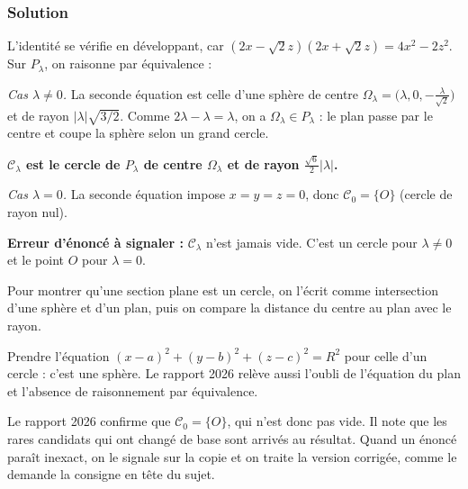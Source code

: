 \documentclass[11pt,a4paper]{article}
\newcommand{\equationajustee}[1]{%
  \sbox{\boiteequation}{$\displaystyle #1$}%
  \ifdim\wd\boiteequation>\linewidth
    \[\resizebox{\linewidth}{!}{\usebox{\boiteequation}}\]%
  \else
    \[#1\]%
  \fi}
\begin{document}
\hypertarget{solution-34}{%
\subsubsection{Solution}\label{solution-34}}

L'identité se vérifie en développant, car \((2x-\sqrt2z)(2x+\sqrt2z)=4x^2-2z^2\). Sur \(P_\lambda\), on raisonne par équivalence :

\equationajustee{M\in{\mathcal{C}}_\lambda\iff\begin{cases}2x+\sqrt2z=\lambda\\ (x-\lambda)^2+y^2+\big(z+\frac\lambda{\sqrt2}\big)^2=\frac32\lambda^2.\end{cases}}

\emph{Cas \(\lambda\neq0\).} La seconde équation est celle d'une sphère de centre \(\Omega_\lambda=\big(\lambda,0,-\frac\lambda{\sqrt2}\big)\) et de rayon \(|\lambda|\sqrt{3/2}\). Comme \(2\lambda-\lambda=\lambda\), on a \(\Omega_\lambda\in P_\lambda\) : le plan passe par le centre et coupe la sphère selon un grand cercle.

\textbf{\({\mathcal{C}}_\lambda\) est le cercle de \(P_\lambda\) de centre \(\Omega_\lambda\) et de rayon \(\frac{\sqrt6}2|\lambda|\).}

\emph{Cas \(\lambda=0\).} La seconde équation impose \(x=y=z=0\), donc \({\mathcal{C}}_0=\{O\}\) (cercle de rayon nul).

\textbf{Erreur d'énoncé à signaler :} \({\mathcal{C}}_\lambda\) n'est jamais vide. C'est un cercle pour \(\lambda\neq0\) et le point \(O\) pour \(\lambda=0\).

\begin{methode}

Pour montrer qu'une section plane est un cercle, on l'écrit comme intersection d'une sphère et d'un plan, puis on compare la distance du centre au plan avec le rayon.

\end{methode}

\begin{piege}

Prendre l'équation \((x-a)^2+(y-b)^2+(z-c)^2=R^2\) pour celle d'un cercle : c'est une sphère. Le rapport 2026 relève aussi l'oubli de l'équation du plan et l'absence de raisonnement par équivalence.

\end{piege}

\begin{jury}

Le rapport 2026 confirme que \({\mathcal{C}}_0=\{O\}\), qui n'est donc pas vide. Il note que les rares candidats qui ont changé de base sont arrivés au résultat. Quand un énoncé paraît inexact, on le signale sur la copie et on traite la version corrigée, comme le demande la consigne en tête du sujet.

\end{jury}
\end{document}

